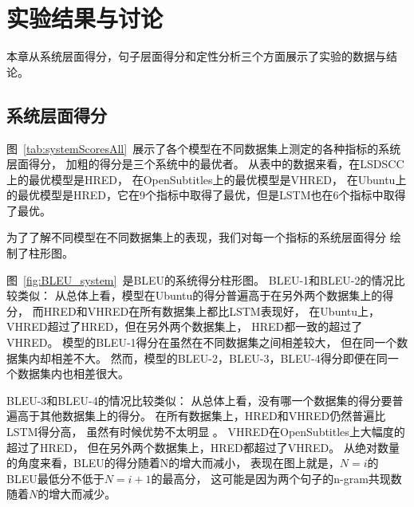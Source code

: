 
\chapter{实验结果与讨论}\label{ch:experiment}
本章从系统层面得分，句子层面得分和定性分析三个方面展示了实验的数据与结论。

\section{系统层面得分}\label{sec:system_scores}
图~\ref{tab:systemScoresAll}~展示了各个模型在不同数据集上测定的各种指标的系统层面得分，
加粗的得分是三个系统中的最优者。
从表中的数据来看，在LSDSCC上的最优模型是HRED，
在OpenSubtitles上的最优模型是VHRED，
在Ubuntu上的最优模型是HRED，它在9个指标中取得了最优，但是LSTM也在6个指标中取得了最优。


为了了解不同模型在不同数据集上的表现，我们对每一个指标的系统层面得分
绘制了柱形图。

图~\ref{fig:BLEU_system}~是BLEU的系统得分柱形图。
BLEU-1和BLEU-2的情况比较类似：
从总体上看，模型在Ubuntu的得分普遍高于在另外两个数据集上的得分，
而HRED和VHRED在所有数据集上都比LSTM表现好，
在Ubuntu上，VHRED超过了HRED，但在另外两个数据集上，
HRED都一致的超过了VHRED。
模型的BLEU-1得分在虽然在不同数据集之间相差较大，
但在同一个数据集内却相差不大。
然而，模型的BLEU-2，BLEU-3，BLEU-4得分即便在同一个数据集内也相差很大。

BLEU-3和BLEU-4的情况比较类似：
从总体上看，没有哪一个数据集的得分要普遍高于其他数据集上的得分。
在所有数据集上，HRED和VHRED仍然普遍比LSTM得分高，
虽然有时候优势不太明显 。
VHRED在OpenSubtitles上大幅度的超过了HRED，
但在另外两个数据集上，HRED都超过了VHRED。
从绝对数量的角度来看，BLEU的得分随着N的增大而减小，
表现在图上就是，$N = i$的BLEU最低分不低于$N = i + 1$的最高分，
这可能是因为两个句子的n-gram共现数随着$N$的增大而减少。

